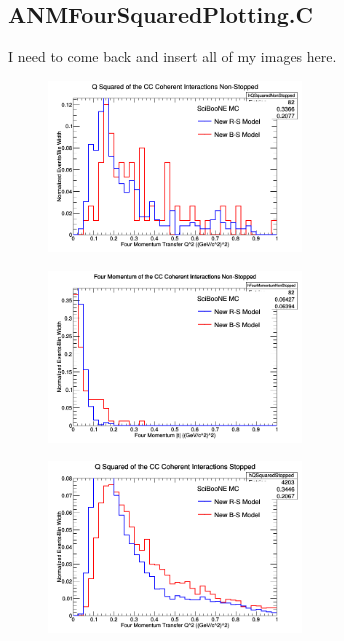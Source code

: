 \documentclass[11pt]{article}
\begin{document}
\subsection{ANMFourSquaredPlotting.C}
I need to come back and insert all of my images here.

\begin{figure}[H]
\centering
\includegraphics[width=0.6\textwidth]{ANMFourSquaredPlottingImages/1-ANMFourSquaredPlotting.png}
\caption{}
\end{figure}

\begin{figure}[H]
\centering
\includegraphics[width=0.6\textwidth]{ANMFourSquaredPlottingImages/2-ANMFourSquaredPlotting.png}
\caption{}
\end{figure}

\begin{figure}[H]
\centering
\includegraphics[width=0.6\textwidth]{ANMFourSquaredPlottingImages/3-ANMFourSquaredPlotting.png}
\caption{}
\end{figure}
\end{document}
